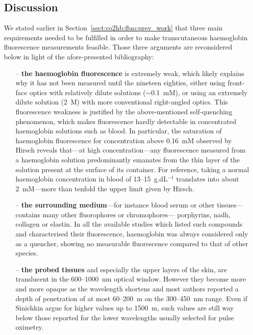 \subsection{Discussion}

We stated earlier in Section~\ref{sect:co2hb:fluo:prev_work} that three main requirements needed to be fulfilled in order to make transcutaneous haemoglobin fluorescence measurements feasible. Those three arguments are reconsidered below in light of the afore-presented bibliography:

\begin{itemize}
	\item[--] \textbf{the haemoglobin fluorescence} is extremely weak, which likely explains why it has not been measured until the nineteen eighties, either using front-face optics with relatively dilute solutions ($\sim$0.1~mM)\cite{hirsch1980}, or using an extremely dilute solution (2~\textmu{}M) with more conventional right-angled optics\cite{alpert1980}. This fluorescence weakness is justified by the above-mentioned self-quenching phenomenon, which makes fluorescence hardly detectable in concentrated haemoglobin solutions such as blood. In particular, the saturation of haemoglobin fluorescence for concentration above 0.16~mM observed by Hirsch \etal{}\cite{hirsch1980} reveals that---at high concentration---any fluorescence measured from a haemoglobin solution predominantly emanates from the thin layer of the solution present at the surface of its container. For reference, taking a normal haemoglobin concentration in blood of 13--15~g.dL$^{-1}$\cite{us_hematological2005} translates into about 2~mM---more than tenfold the upper limit given by Hirsch.
	\item[--] \textbf{the surrounding medium}---for instance blood serum or other tissues---contains many other fluorophores or chromophores---\eg{} porphyrins, \gls{nadh}, collagen or elastin. In all the available studies which listed such compounds and characterised their fluorescence, haemoglobin was always considered only as a quencher, showing no measurable fluorescence compared to that of other species\cite{wolfbeis1985, wagnieres1998, kollias2002, vishwanath2011}.
	\item[--] \textbf{the probed tissues} and especially the upper layers of the skin, are translucent in the 600--1000~nm optical window. However they become more and more opaque as the wavelength shortens and most authors reported a depth of penetration of at most 60--200~\textmu{}m on the 300--450~nm range\cite{bruls1984, gmitro1988, koenig1998, barun2007, young1997}. Even if Sinichkin \etal{} argue for higher values up to 1500~\textmu{}m\cite{sinichkin1998}, such values are still way below those reported for the lower wavelengths usually selected for pulse oximetry.
\end{itemize}


